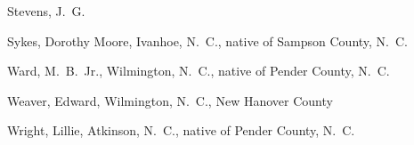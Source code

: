 \documentclass[11pt, a5paper, openright]{book}
\begin{document}
\begin{thebibliography}{99}
  Stevens, J.~G.

  Sykes, Dorothy Moore, Ivanhoe, N.~C., native of Sampson County, N.~C.

  Ward, M.~B.~Jr., Wilmington, N.~C., native of Pender County, N.~C.

  Weaver, Edward, Wilmington, N.~C., New Hanover County

  Wright, Lillie, Atkinson, N.~C., native of Pender County, N.~C.

\end{thebibliography}

\printindex{}
\end{document}
